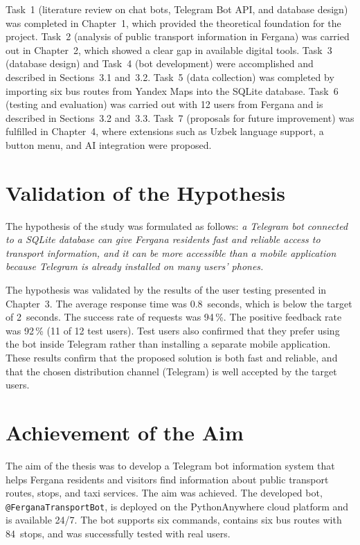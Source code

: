 Task~1 (literature review on chat bots, Telegram Bot API, and database
design) was completed in Chapter~1, which provided the theoretical
foundation for the project. Task~2 (analysis of public transport information
in Fergana) was carried out in Chapter~2, which showed a clear gap in
available digital tools. Task~3 (database design) and Task~4 (bot
development) were accomplished and described in Sections~3.1 and~3.2.
Task~5 (data collection) was completed by importing six bus routes from
Yandex Maps into the SQLite database. Task~6 (testing and evaluation) was
carried out with 12 users from Fergana and is described in Sections~3.2
and~3.3. Task~7 (proposals for future improvement) was fulfilled in
Chapter~4, where extensions such as Uzbek language support, a button menu,
and AI integration were proposed.

\section*{Validation of the Hypothesis}

The hypothesis of the study was formulated as follows: \textit{a Telegram
bot connected to a SQLite database can give Fergana residents fast and
reliable access to transport information, and it can be more accessible
than a mobile application because Telegram is already installed on many
users' phones.}

The hypothesis was validated by the results of the user testing presented
in Chapter~3. The average response time was 0.8~seconds, which is below
the target of 2~seconds. The success rate of requests was 94\,\%. The
positive feedback rate was 92\,\% (11 of 12 test users). Test users also
confirmed that they prefer using the bot inside Telegram rather than
installing a separate mobile application. These results confirm that the
proposed solution is both fast and reliable, and that the chosen
distribution channel (Telegram) is well accepted by the target users.

\section*{Achievement of the Aim}

The aim of the thesis was to develop a Telegram bot information system that
helps Fergana residents and visitors find information about public transport
routes, stops, and taxi services. The aim was achieved. The developed bot,
\texttt{@FerganaTransportBot}, is deployed on the PythonAnywhere cloud
platform and is available 24/7. The bot supports six commands, contains six
bus routes with 84~stops, and was successfully tested with real users.

